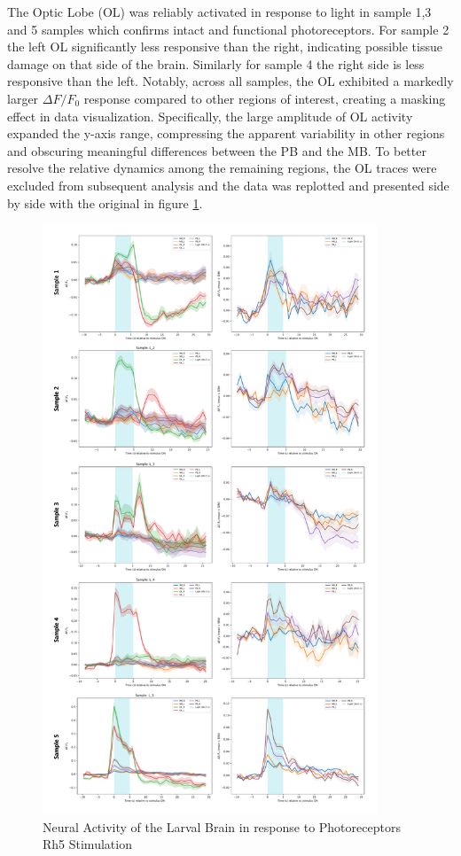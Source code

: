 The Optic Lobe (OL) was reliably activated in response to light in sample 1,3 and 5 samples which confirms intact and functional photoreceptors. For sample 2 the left OL significantly less responsive than the right, indicating possible tissue damage on that side of the brain. Similarly for sample 4 the right side is less responsive than the left. 
Notably, across all samples, the OL exhibited a markedly larger $\Delta F/F_0$ response compared to other regions of interest, creating a masking effect in data visualization. Specifically, the large amplitude of OL activity expanded the y-axis range, compressing the apparent variability in other regions and obscuring meaningful differences between the PB and the MB. To better resolve the relative dynamics among the remaining regions, the OL traces were excluded from subsequent analysis and the data was replotted and presented side by side with the original in figure \ref{LSanalysis}. 

 
    \begin{figure}
        \centering
        \includegraphics[width=10cm]{Figs/CX/LSanalysis.pdf}
        \caption[Neural Activity of the Larval Brain in response to Photoreceptors Rh5 Stimulation]{Neural Activity of the Larval Brain in response to Photoreceptors Rh5 Stimulation}
        \label{LSanalysis}
    \end{figure}


